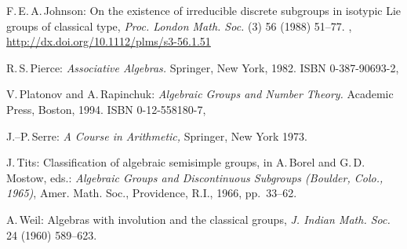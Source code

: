 \begin{references}{99}
 F.\,E.\,A.\,Johnson:
 On the existence of irreducible discrete subgroups in
isotypic Lie groups of classical type,
 \emph{Proc. London Math. Soc.} (3) 56 (1988) 51--77.
 ,
 \maynewline
 \url{http://dx.doi.org/10.1112/plms/s3-56.1.51}

R.\,S.\,Pierce:
 \emph{Associative Algebras.}
 Springer, New York, 1982.
 ISBN 0-387-90693-2,

 V.\,Platonov and A.\,Rapinchuk: 
 \emph{Algebraic Groups and Number Theory.}
 Academic Press, Boston, 1994.
 ISBN 0-12-558180-7,
 
 J.--P.\,Serre:
 \emph{A Course in Arithmetic,}
 Springer, New York 1973.

J.\,Tits:
Classification of algebraic semisimple groups,
in A.\,Borel and G.\,D.\,Mostow, eds.:
\emph{Algebraic Groups and Discontinuous Subgroups (Boulder, Colo., 1965)},
Amer. Math. Soc., Providence, R.I., 1966,  pp.~33--62.

 A.\,Weil:
 Algebras with involution and the classical groups,
 \emph{J. Indian Math. Soc.} 24 (1960) 589--623.

 \end{references}
